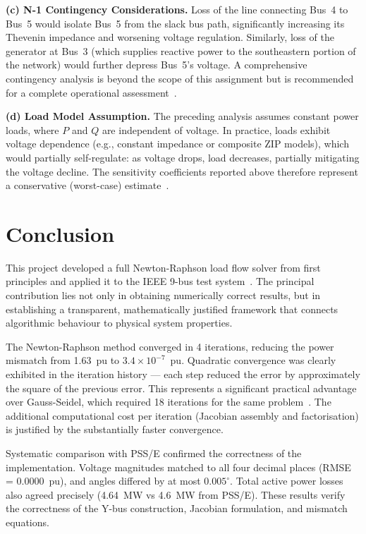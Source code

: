 \documentclass[12pt, a4paper]{article}
\begin{document}
\textbf{(c) N-1 Contingency Considerations.}
Loss of the line connecting Bus~4 to Bus~5 would isolate Bus~5 from the slack bus path, significantly increasing its Thevenin impedance and worsening voltage regulation. Similarly, loss of the generator at Bus~3 (which supplies reactive power to the southeastern portion of the network) would further depress Bus~5's voltage. A comprehensive contingency analysis is beyond the scope of this assignment but is recommended for a complete operational assessment~\cite{anderson}.

\textbf{(d) Load Model Assumption.}
The preceding analysis assumes constant power loads, where $P$ and $Q$ are independent of voltage. In practice, loads exhibit voltage dependence (e.g., constant impedance or composite ZIP models), which would partially self-regulate: as voltage drops, load decreases, partially mitigating the voltage decline. The sensitivity coefficients reported above therefore represent a conservative (worst-case) estimate~\cite{saadat}.

\newpage
\section{Conclusion}

This project developed a full Newton-Raphson load flow solver from first principles and applied it to the IEEE 9-bus test system~\cite{anderson}. The principal contribution lies not only in obtaining numerically correct results, but in establishing a transparent, mathematically justified framework that connects algorithmic behaviour to physical system properties.

The Newton-Raphson method converged in 4 iterations, reducing the power mismatch from 1.63~pu to $3.4 \times 10^{-7}$~pu. Quadratic convergence was clearly exhibited in the iteration history --- each step reduced the error by approximately the square of the previous error. This represents a significant practical advantage over Gauss-Seidel, which required 18 iterations for the same problem~\cite{saadat}. The additional computational cost per iteration (Jacobian assembly and factorisation) is justified by the substantially faster convergence.

Systematic comparison with PSS/E confirmed the correctness of the implementation. Voltage magnitudes matched to all four decimal places (RMSE = 0.0000~pu), and angles differed by at most $0.005^{\circ}$. Total active power losses also agreed precisely (4.64~MW vs 4.6~MW from PSS/E). These results verify the correctness of the Y-bus construction, Jacobian formulation, and mismatch equations.
\end{document}
